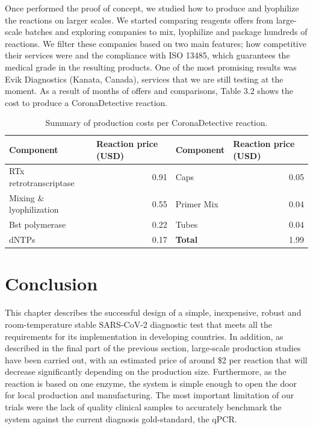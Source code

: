 Once performed the proof of concept, we studied how to produce and lyophilize the reactions on larger scales. We started comparing reagents offers from large-scale batches and exploring companies to mix, lyophilize and package hundreds of reactions. We filter these companies based on two main features; how competitive their services were and the compliance with ISO 13485, which guarantees the medical grade in the resulting products. One of the most promising results was Evik Diagnostics (Kanata, Canada), services that we are still testing at the moment. As a result of months of offers and comparisons, Table 3.2 shows the cost to produce a CoronaDetective reaction.
\begin{table}[]
\begin{center}
\begin{tabular}{lr|lr}
\textbf{Component} & \multicolumn{1}{l|}{\textbf{Reaction price (USD)}} & \textbf{Component} & \multicolumn{1}{l}{\textbf{Reaction price (USD)}} \\ \hline
RTx retrotranscriptase & 0.91 & Caps & 0.05 \\
Mixing \& lyophilization  & 0.55 & Primer Mix & 0.04 \\
Bst polymerase & 0.22 & Tubes & 0.04 \\
dNTPs & 0.17 & \textbf{Total} & 1.99
\end{tabular}
\end{center}
\vspace{10pt}
\caption{Summary of production costs per CoronaDetective reaction.}
\end{table}


\section{Conclusion}
This chapter describes the successful design of a simple, inexpensive, robust and room-temperature stable SARS-CoV-2 diagnostic test that meets all the requirements for its implementation in developing countries. In addition, as described in the final part of the previous section, large-scale production studies have been carried out, with an estimated price of around \$2 per reaction that will decrease significantly depending on the production size. Furthermore, as the reaction is based on one enzyme, the system is simple enough to open the door for local production and manufacturing. The most important limitation of our trials were the lack of quality clinical samples to accurately benchmark the system against the current diagnosis gold-standard, the qPCR.

